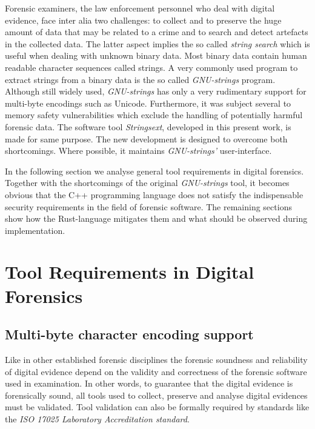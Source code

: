 \documentclass[final,5p,times,twocolumn]{elsarticle}
\begin{document}
Forensic examiners, the law enforcement personnel who deal with digital
evidence, face inter alia two challenges: to collect and to preserve the huge
amount of data that may be related to a crime and to search and detect artefacts
in the collected data.  The latter aspect implies the so called \emph{string
search} which is useful when dealing with unknown binary data. Most binary data
contain human readable character sequences called strings. A very commonly used
program to extract strings from a binary data is the so called
\emph{GNU-strings} program.  Although still widely used, \emph{GNU-strings} has
only a very rudimentary support for multi-byte encodings such as Unicode.
Furthermore, it was subject several to memory safety vulnerabilities which
exclude the handling of potentially harmful forensic data. The software tool
\emph{Stringsext}, developed in this present work, is made for same purpose. The
new development is designed to overcome both shortcomings.  Where possible, it
maintains \emph{GNU-strings'} user-interface. 

In the following section we analyse general tool requirements in digital
forensics. Together with the shortcomings of the original  \emph{GNU-strings}
tool, it becomes obvious that the C++ programming language does not satisfy the
indispensable security requirements in the field of forensic software. The
remaining sections show how the Rust-language mitigates them and what should be
observed during implementation. 



\section{Tool Requirements in Digital Forensics}
\label{sec:tool-requirements}

\subsection{Multi-byte character encoding support}
\label{subsec:tool-validation}

Like in other established forensic disciplines the forensic soundness and
reliability of digital evidence depend on the validity and correctness of the
forensic software used in examination. In other words, to guarantee that the
digital evidence is forensically sound, all tools used to collect, preserve and
analyse digital evidences must be validated. Tool validation can also be
formally required by standards like the \emph{ISO 17025 Laboratory
Accreditation standard}.
\end{document}
